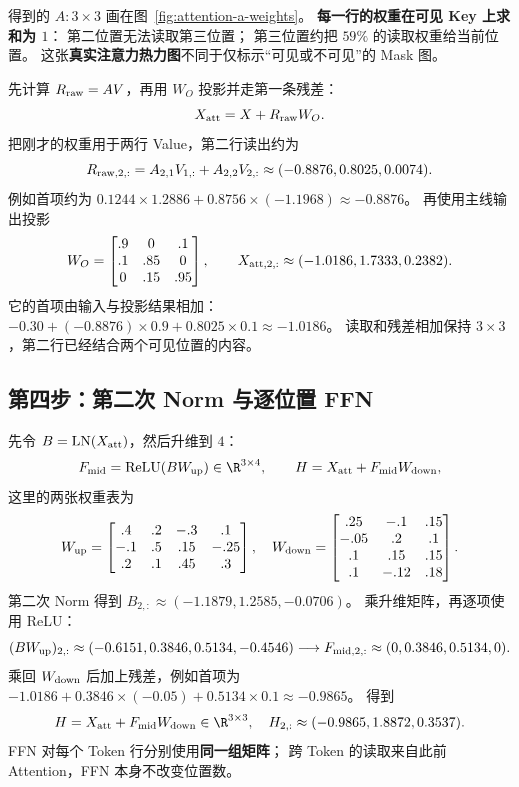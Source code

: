 得到的 $A:3\times3$ 画在图~\ref{fig:attention-a-weights}。
\textbf{每一行的权重在可见 Key 上求和为 $1$}：
第二位置无法读取第三位置；
第三位置约把 $59\%$ 的读取权重给当前位置。
这张\textbf{真实注意力热力图}不同于仅标示“可见或不可见”的 Mask 图。

\par\medskip


先计算 $R_{\rm raw}=AV$，再用 $W_O$ 投影并走第一条残差：
\[
X_{\rm att}=X+R_{\rm raw}W_O.
\]
把刚才的权重用于两行 Value，第二行读出约为
\[
R_{{\rm raw},2,:}=A_{2,1}V_{1,:}+A_{2,2}V_{2,:}
\approx(-0.8876,0.8025,0.0074).
\]
例如首项约为 $0.1244\times1.2886+0.8756\times(-1.1968)\approx-0.8876$。
再使用主线输出投影
\[
W_O=\begin{bmatrix}.9&0&.1\\.1&.85&0\\0&.15&.95\end{bmatrix},\qquad
X_{{\rm att},2,:}\approx(-1.0186,1.7333,0.2382).
\]
它的首项由输入与投影结果相加：
$-0.30+(-0.8876)\times0.9+0.8025\times0.1\approx-1.0186$。
读取和残差相加保持 $3\times3$，第二行已经结合两个可见位置的内容。

\subsection{第四步：第二次 Norm 与逐位置 FFN}

先令 $B=\operatorname{LN}(X_{\rm att})$，然后升维到 $4$：
\[
F_{\rm mid}=\operatorname{ReLU}(BW_{\rm up})\in\R^{3\times4},
\qquad
H=X_{\rm att}+F_{\rm mid}W_{\rm down},
\]
这里的两张权重表为
\[
W_{\rm up}=\begin{bmatrix}.4&.2&-.3&.1\\-.1&.5&.15&-.25\\.2&.1&.45&.3\end{bmatrix},\quad
W_{\rm down}=\begin{bmatrix}.25&-.1&.15\\-.05&.2&.1\\.1&.15&.15\\.1&-.12&.18\end{bmatrix}.
\]
第二次 Norm 得到 $B_{2,:}\approx(-1.1879,1.2585,-0.0706)$。
乘升维矩阵，再逐项使用 ReLU：
\[
(BW_{\rm up})_{2,:}\approx(-0.6151,0.3846,0.5134,-0.4546)
\longrightarrow F_{{\rm mid},2,:}\approx(0,0.3846,0.5134,0).
\]
乘回 $W_{\rm down}$ 后加上残差，例如首项为
$-1.0186+0.3846\times(-0.05)+0.5134\times0.1\approx-0.9865$。
得到
\begin{equation}
H=X_{\rm att}+F_{\rm mid}W_{\rm down}\in\R^{3\times3},
\quad H_{2,:}\approx(-0.9865,1.8872,0.3537).
\label{eq:three-token-block-output}
\end{equation}
FFN 对每个 Token 行分别使用\textbf{同一组矩阵}；
跨 Token 的读取来自此前 Attention，FFN 本身不改变位置数。

